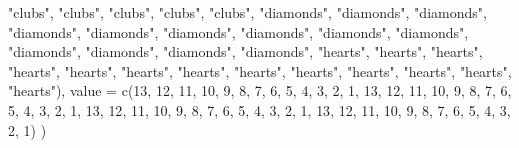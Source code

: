 \documentclass[
  letterpaper,
  DIV=11,
  numbers=noendperiod]{scrbook}
\newenvironment{Shaded}{\begin{snugshade}}{\end{snugshade}}
\newcommand{\AttributeTok}[1]{\textcolor[rgb]{0.40,0.45,0.13}{#1}}
\newcommand{\DecValTok}[1]{\textcolor[rgb]{0.68,0.00,0.00}{#1}}
\newcommand{\FunctionTok}[1]{\textcolor[rgb]{0.28,0.35,0.67}{#1}}
\newcommand{\NormalTok}[1]{\textcolor[rgb]{0.00,0.23,0.31}{#1}}
\newcommand{\StringTok}[1]{\textcolor[rgb]{0.13,0.47,0.30}{#1}}
\begin{document}
\begin{Shaded}
\begin{Highlighting}[]
    \StringTok{"clubs"}\NormalTok{, }\StringTok{"clubs"}\NormalTok{, }\StringTok{"clubs"}\NormalTok{, }\StringTok{"clubs"}\NormalTok{, }\StringTok{"clubs"}\NormalTok{, }\StringTok{"diamonds"}\NormalTok{, }\StringTok{"diamonds"}\NormalTok{, }
    \StringTok{"diamonds"}\NormalTok{, }\StringTok{"diamonds"}\NormalTok{, }\StringTok{"diamonds"}\NormalTok{, }\StringTok{"diamonds"}\NormalTok{, }\StringTok{"diamonds"}\NormalTok{, }\StringTok{"diamonds"}\NormalTok{, }
    \StringTok{"diamonds"}\NormalTok{, }\StringTok{"diamonds"}\NormalTok{, }\StringTok{"diamonds"}\NormalTok{, }\StringTok{"diamonds"}\NormalTok{, }\StringTok{"diamonds"}\NormalTok{, }\StringTok{"hearts"}\NormalTok{, }
    \StringTok{"hearts"}\NormalTok{, }\StringTok{"hearts"}\NormalTok{, }\StringTok{"hearts"}\NormalTok{, }\StringTok{"hearts"}\NormalTok{, }\StringTok{"hearts"}\NormalTok{, }\StringTok{"hearts"}\NormalTok{, }\StringTok{"hearts"}\NormalTok{, }
    \StringTok{"hearts"}\NormalTok{, }\StringTok{"hearts"}\NormalTok{, }\StringTok{"hearts"}\NormalTok{, }\StringTok{"hearts"}\NormalTok{, }\StringTok{"hearts"}\NormalTok{), }
  \AttributeTok{value =} \FunctionTok{c}\NormalTok{(}\DecValTok{13}\NormalTok{, }\DecValTok{12}\NormalTok{, }\DecValTok{11}\NormalTok{, }\DecValTok{10}\NormalTok{, }\DecValTok{9}\NormalTok{, }\DecValTok{8}\NormalTok{, }\DecValTok{7}\NormalTok{, }\DecValTok{6}\NormalTok{, }\DecValTok{5}\NormalTok{, }\DecValTok{4}\NormalTok{, }\DecValTok{3}\NormalTok{, }\DecValTok{2}\NormalTok{, }\DecValTok{1}\NormalTok{, }\DecValTok{13}\NormalTok{, }\DecValTok{12}\NormalTok{, }\DecValTok{11}\NormalTok{, }\DecValTok{10}\NormalTok{, }\DecValTok{9}\NormalTok{, }\DecValTok{8}\NormalTok{, }
    \DecValTok{7}\NormalTok{, }\DecValTok{6}\NormalTok{, }\DecValTok{5}\NormalTok{, }\DecValTok{4}\NormalTok{, }\DecValTok{3}\NormalTok{, }\DecValTok{2}\NormalTok{, }\DecValTok{1}\NormalTok{, }\DecValTok{13}\NormalTok{, }\DecValTok{12}\NormalTok{, }\DecValTok{11}\NormalTok{, }\DecValTok{10}\NormalTok{, }\DecValTok{9}\NormalTok{, }\DecValTok{8}\NormalTok{, }\DecValTok{7}\NormalTok{, }\DecValTok{6}\NormalTok{, }\DecValTok{5}\NormalTok{, }\DecValTok{4}\NormalTok{, }\DecValTok{3}\NormalTok{, }\DecValTok{2}\NormalTok{, }\DecValTok{1}\NormalTok{, }\DecValTok{13}\NormalTok{, }\DecValTok{12}\NormalTok{, }\DecValTok{11}\NormalTok{, }
    \DecValTok{10}\NormalTok{, }\DecValTok{9}\NormalTok{, }\DecValTok{8}\NormalTok{, }\DecValTok{7}\NormalTok{, }\DecValTok{6}\NormalTok{, }\DecValTok{5}\NormalTok{, }\DecValTok{4}\NormalTok{, }\DecValTok{3}\NormalTok{, }\DecValTok{2}\NormalTok{, }\DecValTok{1}\NormalTok{)}
\NormalTok{)}
\end{Highlighting}
\end{Shaded}
\end{document}
